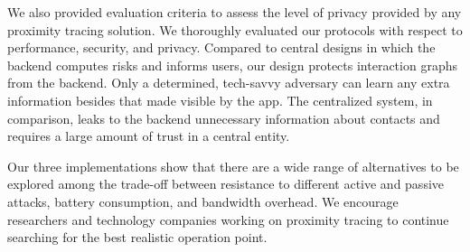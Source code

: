 \documentclass{article}
\begin{document}
We also provided evaluation criteria to assess the level of privacy
provided by any proximity tracing solution. We thoroughly evaluated our
protocols with respect to performance, security, and privacy. Compared
to central designs in which the backend computes risks and informs
users, our design protects interaction graphs from the backend. Only a
determined, tech-savvy adversary can learn any extra information besides
that made visible by the app. The centralized system, in comparison,
leaks to the backend unnecessary information about contacts and requires
a large amount of trust in a central entity.

Our three implementations show that there are a wide range of
alternatives to be explored among the trade-off between resistance to
different active and passive attacks, battery consumption, and bandwidth
overhead. We encourage researchers and technology companies working on
proximity tracing to continue searching for the best realistic operation
point.
\end{document}
